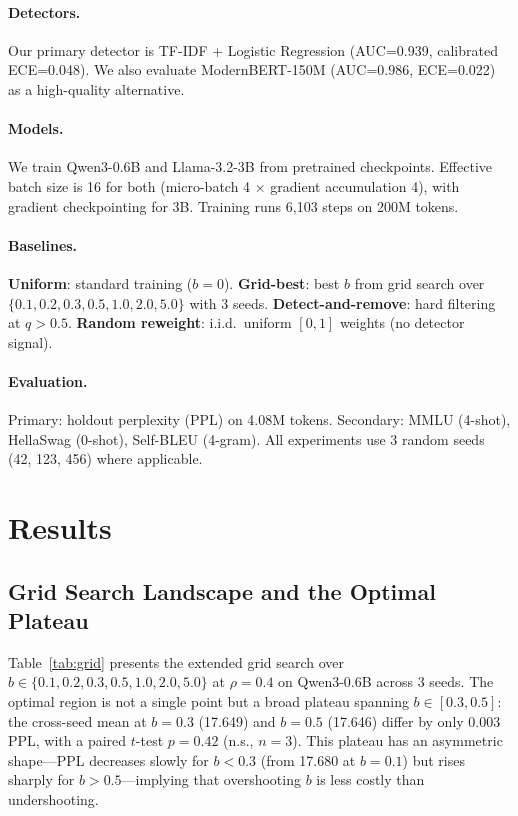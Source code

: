 \documentclass[11pt]{article}
\begin{document}
\paragraph{Detectors.}
Our primary detector is TF-IDF + Logistic Regression (AUC=0.939, calibrated ECE=0.048). We also evaluate ModernBERT-150M (AUC=0.986, ECE=0.022) as a high-quality alternative.

\paragraph{Models.}
We train Qwen3-0.6B and Llama-3.2-3B from pretrained checkpoints. Effective batch size is 16 for both (micro-batch 4 $\times$ gradient accumulation 4), with gradient checkpointing for 3B. Training runs 6,103 steps on 200M tokens.

\paragraph{Baselines.}
\textbf{Uniform}: standard training ($b=0$). \textbf{Grid-best}: best $b$ from grid search over $\{0.1, 0.2, 0.3, 0.5, 1.0, 2.0, 5.0\}$ with 3 seeds. \textbf{Detect-and-remove}: hard filtering at $q > 0.5$. \textbf{Random reweight}: i.i.d.\ uniform $[0,1]$ weights (no detector signal).

\paragraph{Evaluation.}
Primary: holdout perplexity (PPL) on 4.08M tokens. Secondary: MMLU (4-shot), HellaSwag (0-shot), Self-BLEU (4-gram). All experiments use 3 random seeds (42, 123, 456) where applicable.

\section{Results}
\label{sec:results}

\subsection{Grid Search Landscape and the Optimal Plateau}
\label{sec:grid}

Table~\ref{tab:grid} presents the extended grid search over $b \in \{0.1, 0.2, 0.3, 0.5, 1.0, 2.0, 5.0\}$ at $\rho=0.4$ on Qwen3-0.6B across 3 seeds. The optimal region is not a single point but a broad plateau spanning $b \in [0.3, 0.5]$: the cross-seed mean at $b=0.3$ (17.649) and $b=0.5$ (17.646) differ by only 0.003 PPL, with a paired $t$-test $p=0.42$ (n.s., $n=3$). This plateau has an asymmetric shape---PPL decreases slowly for $b < 0.3$ (from 17.680 at $b=0.1$) but rises sharply for $b > 0.5$---implying that overshooting $b$ is less costly than undershooting.
\end{document}
